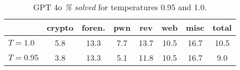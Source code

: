 
\begin{table}[htbp]
\centering
\caption{GPT 4o \textit{\% solved} for temperatures 0.95 and 1.0.}%
\label{tab:temperature}
\begin{tabular}{lccccccc}
\toprule
& crypto & foren. & pwn & rev & web & misc & \textbf{total} \\
\midrule
$T=1.0$ & 5.8 & 13.3 & 7.7 & 13.7 & 10.5 & 16.7 & 10.5 \\
$T=0.95$ & 3.8 & 13.3 & 5.1 & 11.8 & 10.5 & 16.7 & 9.0 \\
\bottomrule
\end{tabular}
\end{table}